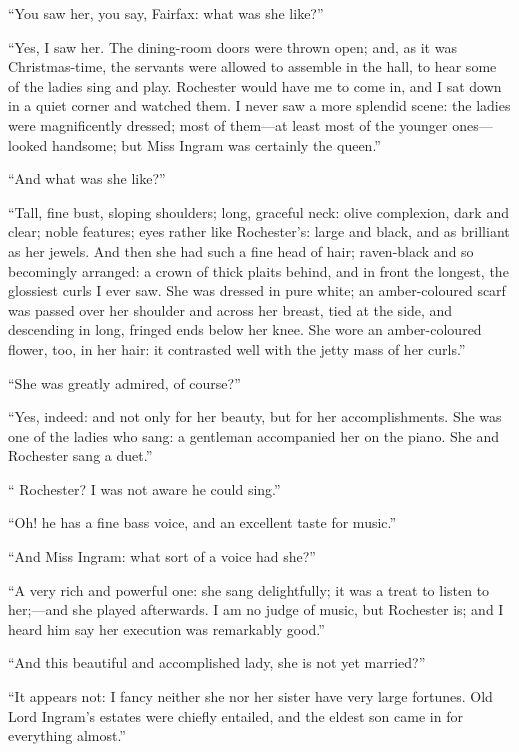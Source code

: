 \enquote{You saw her, you say, \Mrs{} Fairfax: what was she like?}

\enquote{Yes, I saw her.  The dining-room doors were thrown open; and,
	as it was Christmas-time, the servants were allowed to assemble in the
	hall, to hear some of the ladies sing and play.  \Mr{} Rochester would
	have me to come in, and I sat down in a quiet corner and watched them.
	I never saw a more splendid scene: the ladies were magnificently
	dressed; most of them---at least most of the younger ones---looked
	handsome; but Miss Ingram was certainly the queen.}

\enquote{And what was she like?}

\enquote{Tall, fine bust, sloping shoulders; long, graceful neck: olive
	complexion, dark and clear; noble features; eyes rather like \Mr{}
	Rochester's: large and black, and as brilliant as her jewels.  And then
	she had such a fine head of hair; raven-black and so becomingly
	arranged: a crown of thick plaits behind, and in front the longest, the
	glossiest curls I ever saw.  She was dressed in pure white; an
	amber-coloured scarf was passed over her shoulder and across her breast,
	tied at the side, and descending in long, fringed ends below her knee.
	She wore an amber-coloured flower, too, in her hair: it contrasted well
	with the jetty mass of her curls.}

\enquote{She was greatly admired, of course?}

\enquote{Yes, indeed: and not only for her beauty, but for her
	accomplishments.  She was one of the ladies who sang: a gentleman
	accompanied her on the piano.  She and \Mr{} Rochester sang a duet.}

\enquote{\Mr{} Rochester?  I was not aware he could sing.}

\enquote{Oh! he has a fine bass voice, and an excellent taste for
	music.}

\enquote{And Miss Ingram: what sort of a voice had she?}

\enquote{A very rich and powerful one: she sang delightfully; it was a
	treat to listen to her;---and she played afterwards.  I am no judge of
	music, but \Mr{} Rochester is; and I heard him say her execution was
	remarkably good.}

\enquote{And this beautiful and accomplished lady, she is not yet
	married?}

\enquote{It appears not: I fancy neither she nor her sister have very
	large fortunes.  Old Lord Ingram's estates were chiefly entailed, and
	the eldest son came in for everything almost.}

